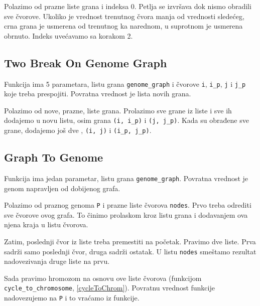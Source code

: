 Polazimo od prazne liste grana i indeksa 0. Petlja se izvršava dok nismo obradili sve čvorove. Ukoliko je vrednost trenutnog čvora manja od vrednosti sledećeg, crna grana je usmerena od trenutnog ka narednom, u suprotnom je usmerena obrnuto. Indeks uvećavamo sa korakom 2.





\subsection{Two Break On Genome Graph}
\label{twoBreakOnGenomeGraph}

Funkcija ima 5 parametara, listu grana \texttt{genome\_graph} i čvorove \texttt{i}, \texttt{i\_p}, \texttt{j} i \texttt{j\_p} koje treba prespojiti. Povratna vrednost je lista novih grana.

Polazimo od nove, prazne, liste grana. Prolazimo sve grane iz liste i sve ih dodajemo u novu listu, osim grana \texttt{(i, i\_p)} i \texttt{(j, j\_p)}. Kada su obrađene sve grane, dodajemo još dve , \texttt{(i, j)} i \texttt{(i\_p, j\_p)}.




\subsection{Graph To Genome}
\label{graphToGenome}

Funkcija ima jedan parametar, listu grana \texttt{genome\_graph}. Povratna vrednost je genom napravljen od dobijenog grafa.

Polazimo od praznog genoma \texttt{P} i prazne liste čvorova \texttt{nodes}. Prvo treba odrediti sve čvorove ovog grafa. To činimo prolaskom kroz listu grana i dodavanjem ova njena kraja u listu čvorova.

Zatim, poslednji čvor iz liste treba premestiti na početak. Pravimo dve liste. Prva sadrži samo poslednji čvor, druga sadrži ostatak. U listu \texttt{nodes} smeštamo rezultat nadovezivanja druge liste na prvu.

Sada pravimo hromozom na osnovu ove liste čvorova (funkcijom \texttt{cycle\_to\_chromosome}, \ref{cycleToChrom}). Povratnu vrednost funkcije nadovezujemo na \texttt{P} i to vraćamo iz funkcije.





